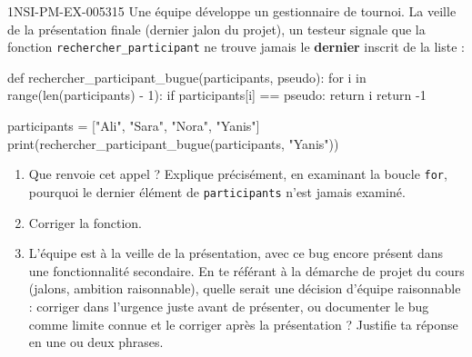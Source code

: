 \begin{exercice}{1NSI-PM-EX-005}{3}{15}
Une équipe développe un gestionnaire de tournoi. La veille de la présentation finale
(dernier jalon du projet), un testeur signale que la fonction
\lstinline{rechercher_participant} ne trouve jamais le \textbf{dernier} inscrit de la
liste :
\begin{python}
def rechercher_participant_bugue(participants, pseudo):
    for i in range(len(participants) - 1):
        if participants[i] == pseudo:
            return i
    return -1

participants = ["Ali", "Sara", "Nora", "Yanis"]
print(rechercher_participant_bugue(participants, "Yanis"))
\end{python}
\begin{enumerate}
  \item Que renvoie cet appel ? Explique précisément, en examinant la boucle \lstinline{for}, pourquoi le dernier élément de \lstinline{participants} n'est jamais examiné.
  \item Corriger la fonction.
  \item L'équipe est à la veille de la présentation, avec ce bug encore présent dans une fonctionnalité secondaire. En te référant à la démarche de projet du cours (jalons, ambition raisonnable), quelle serait une décision d'équipe raisonnable : corriger dans l'urgence juste avant de présenter, ou documenter le bug comme limite connue et le corriger après la présentation ? Justifie ta réponse en une ou deux phrases.
\end{enumerate}
\end{exercice}
